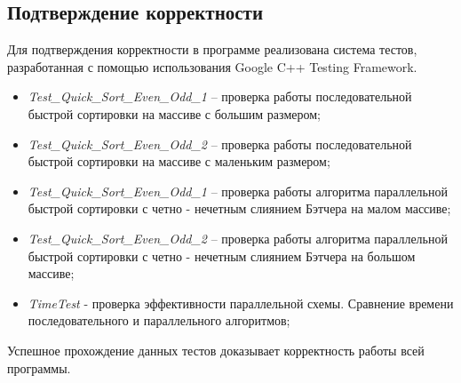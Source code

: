 \documentclass[a4paper]{report}
\begin{document}
\begin{center}
\section*{Подтверждение корректности}
\end{center}
\par Для подтверждения корректности в программе реализована система тестов, разработанная с помощью использования Google C++ Testing Framework.
\begin{itemize}
\item\textit{Test\_Quick\_Sort\_Even\_Odd\_1} – проверка работы последовательной быстрой сортировки на массиве с большим размером;
\item\textit{Test\_Quick\_Sort\_Even\_Odd\_2} – проверка работы последовательной быстрой сортировки на массиве с маленьким размером;
\item\textit{Test\_Quick\_Sort\_Even\_Odd\_1} – проверка работы алгоритма параллельной быстрой сортировки с четно - нечетным слиянием Бэтчера на малом массиве;
\item\textit{Test\_Quick\_Sort\_Even\_Odd\_2} – проверка работы алгоритма параллельной быстрой сортировки с четно - нечетным слиянием Бэтчера на большом массиве;
\item\textit{TimeTest} - проверка эффективности параллельной схемы. Сравнение времени последовательного и параллельного алгоритмов;
\end{itemize}
\par Успешное прохождение данных тестов доказывает корректность работы всей программы.
\newpage
\end{document}

